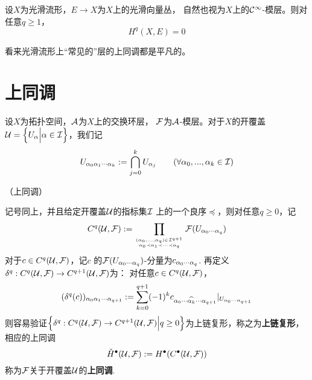 \begin{cor}设$X$为光滑流形，$E\to X$为$X$上的光滑向量丛，
自然也视为$X$上的$\mathcal{C}^\infty$-模层。则对任意$q\geq 1$，
$$H^q(X,E)=0$$
\end{cor}
看来光滑流形上“常见的”层的上同调都是平凡的。



\section{\Cech 上同调}

设$X$为拓扑空间，$\mathcal{A}$为$X$上的交换环层，
$\mathcal{F}$为$\mathcal{A}$-模层。对于$X$的开覆盖
$\mathcal{U}=\Big\{ U_\alpha \Big| \alpha\in\mathcal{I} \Big\}$，我们记
$$
  U_{\alpha_0\alpha_1\cdots\alpha_k}
:=
  \bigcap_{j=0}^k
    U_{\alpha_j}
\qquad
(\forall \alpha_0,...,\alpha_k\in\mathcal{I})
$$


\begin{definition}（\Cech 上同调）

记号同上，并且给定开覆盖$\mathcal{U}$的指标集$\mathcal{I}$
上的一个良序$\preceq$，则对任意$q\geq 0$，记
$$
  C^q(\mathcal{U},\mathcal{F})
:=
  \prod_{(\alpha_0,...,\alpha_q)\in\mathcal{I}^{q+1}
         \atop \alpha_0\prec\alpha_1\prec\cdots\prec\alpha_q
        }
    \mathcal{F}(U_{\alpha_0\cdots\alpha_q})
$$
对于$c\in C^q(\mathcal{U},\mathcal{F})$，记$c$
的$\mathcal{F}(U_{\alpha_0\cdots\alpha_q})$-分量为$c_{\alpha_0\cdots\alpha_q}$.
再定义$\delta^q:C^q(\mathcal{U},\mathcal{F})\to C^{q+1}(\mathcal{U},\mathcal{F})$为：
对任意$c\in C^q(\mathcal{U},\mathcal{F})$，
$$
  (\delta^q(c))_{\alpha_0\alpha_1\cdots\alpha_{q+1}}
:=
  \sum_{k=0}^{q+1}
    (-1)^k
    c_{\alpha_0\cdots\widehat{\alpha_k}\cdots\alpha_{q+1}}
    |_{U_{\alpha_0\cdots\alpha_{q+1}}}
$$
则容易验证$\Big\{ \delta^q:C^q(\mathcal{U},\mathcal{F})\to C^{q+1}(\mathcal{U},\mathcal{F}) \Big| q\geq 0 \Big\}$为上链复形，称之为\textbf{\Cech 上链复形}，
相应的上同调
$$
  \check{H}^{\bullet}(\mathcal{U},\mathcal{F})
:=H^{\bullet}(C^{\bullet}(\mathcal{U},\mathcal{F}))
$$
称为$\mathcal{F}$关于开覆盖$\mathcal{U}$的\textbf{\Cech 上同调}.
\end{definition}

